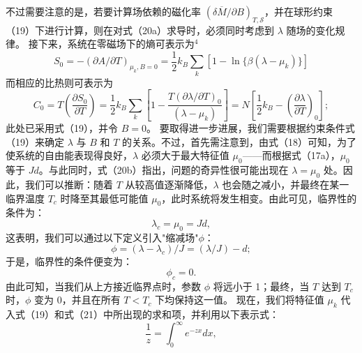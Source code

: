 不过需要注意的是，若要计算场依赖的磁化率 \((\delta\overline{M}/\partial B)_{T,\mathcal{S}}\)，并在球形约束（19）下进行计算，则在对式（20a）求导时，必须同时考虑到 \(\lambda\) 随场的变化规律。
接下来，系统在零磁场下的熵可表示为\(^{4}\)
\begin{equation}\tag{13.4.52}\label{eq:13.4.52}
S _ { 0 } = - ( \partial A / \partial T ) _ { \mu _ { k } , B = 0 } = \frac { 1 } { 2 } k _ { B } \sum _ { k } [ 1 - \ln \{ \beta ( \lambda - \mu _ { k } ) \} ]
\end{equation}
而相应的比热则可表示为
\begin{equation}\tag{13.4.53}\label{eq:13.4.53}
C _ { 0 } = T \left( \frac { \partial S _ { 0 } } { \partial T } \right) = \frac { 1 } { 2 } k _ { B } \sum _ { k } \left[ 1 - \frac { T ( \partial \lambda / \partial T ) _ { 0 } } { ( \lambda - \mu _ { k } ) } \right] = N \left[ \frac { 1 } { 2 } k _ { B } - \left( \frac { \partial \lambda } { \partial T } \right) _ { 0 } \right] ;
\end{equation}
此处已采用式（19），并令 \(B=0\)。
要取得进一步进展，我们需要根据约束条件式（19）来确定 \(\lambda\) 与 \(B\) 和 \(T\) 的关系。不过，首先需注意到，由式（18）可知，为了使系统的自由能表现得良好，\(\lambda\) 必须大于最大特征值 \(\mu_0\)——而根据式（17a），\(\mu_0\) 等于 \(Jd\)。与此同时，式（20b）指出，问题的奇异性很可能出现在 \(\lambda=\mu_0\) 处。因此，我们可以推断：随着 \(T\) 从较高值逐渐降低，\(\lambda\) 也会随之减小，并最终在某一临界温度 \(T_c\) 时降至其最低可能值 \(\mu_0\)，此时系统将发生相变。由此可见，临界性的条件为：
\begin{equation}\tag{13.4.54}\label{eq:13.4.54}
\lambda _ { c } = \mu _ { 0 } = J d ,
\end{equation}
这表明，我们可以通过以下定义引入"缩减场"\(\phi\)：
\begin{equation}\tag{13.4.55}\label{eq:13.4.55}
\phi = ( \lambda - \lambda _ { c } ) / J = ( \lambda / J ) - d ;
\end{equation}
于是，临界性的条件便变为：
\begin{equation}\tag{13.4.56}\label{eq:13.4.56}
\phi _ { c } = 0 .
\end{equation}
由此可知，当我们从上方接近临界点时，参数 \(\phi\) 将远小于 1；最终，当 \(T\) 达到 \(T_c\) 时，\(\phi\) 变为 0，并且在所有 \(T < T_c\) 下均保持这一值。
现在，我们将特征值 \(\mu_{k}\) 代入式（19）和式（21）中所出现的求和项，并利用以下表示式：
\begin{equation}\tag{13.4.57}\label{eq:13.4.57}
\frac { 1 } { z } = \int _ { 0 } ^{\infty} e ^{- z x} d x ,
\end{equation}
